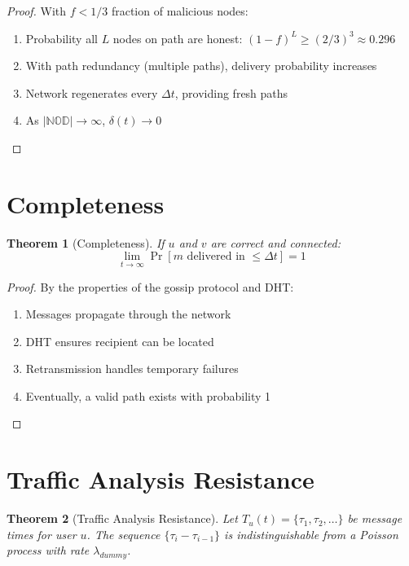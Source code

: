\documentclass[11pt,a4paper]{article}
\newtheorem{theorem}{Theorem}[section]
\begin{document}
\begin{proof}
With $f < 1/3$ fraction of malicious nodes:

\begin{enumerate}
    \item Probability all $L$ nodes on path are honest: $(1-f)^L \geq (2/3)^3 \approx 0.296$
    
    \item With path redundancy (multiple paths), delivery probability increases
    
    \item Network regenerates every $\Delta t$, providing fresh paths
    
    \item As $|\mathbb{NOD}| \rightarrow \infty$, $\delta(t) \rightarrow 0$
\end{enumerate}
\end{proof}

\section{Completeness}

\begin{theorem}[Completeness]
If $u$ and $v$ are correct and connected:
$$\lim_{t \rightarrow \infty} \Pr[m \text{ delivered in } \leq \Delta t] = 1$$
\end{theorem}

\begin{proof}
By the properties of the gossip protocol and DHT:
\begin{enumerate}
    \item Messages propagate through the network
    \item DHT ensures recipient can be located
    \item Retransmission handles temporary failures
    \item Eventually, a valid path exists with probability 1
\end{enumerate}
\end{proof}

\section{Traffic Analysis Resistance}

\begin{theorem}[Traffic Analysis Resistance]
Let $T_u(t) = \{\tau_1, \tau_2, \ldots\}$ be message times for user $u$. The sequence $\{\tau_i - \tau_{i-1}\}$ is indistinguishable from a Poisson process with rate $\lambda_{dummy}$.
\end{theorem}
\end{document}
